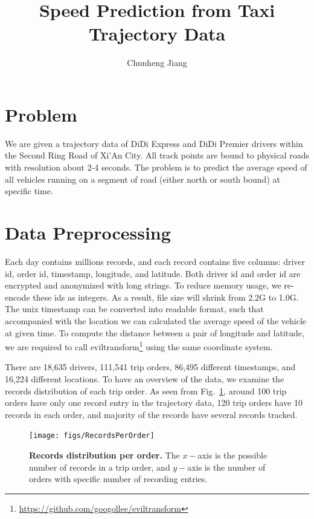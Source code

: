\documentclass[12pt]{article}
\title{Speed Prediction from Taxi Trajectory Data}
\author{Chunheng Jiang}
\numberwithin{table}{section}
\newenvironment{affiliations}{
    \setcounter{enumi}{1}
    \setlength{\parindent}{0in}
    \slshape\sloppy
    \begin{list}{\upshape$^{\arabic{enumi}}$}{
        \usecounter{enumi}
        \setlength{\leftmargin}{0in}
        \setlength{\topsep}{0in}
        \setlength{\labelsep}{0in}
        \setlength{\labelwidth}{0in}
        \setlength{\listparindent}{0in}
        \setlength{\itemsep}{0ex}
        \setlength{\parsep}{0in}
        }
    }{\end{list}\par\vspace{12pt}}
\begin{document}
\maketitle
\noindent


\section*{Problem}
We are given a trajectory data of DiDi Express and DiDi Premier drivers within the Second Ring Road of Xi'An City. 
All track points are bound to physical roads with resolution about 2-4 seconds. The problem is to predict the average speed of all vehicles running on a segment of road (either north or south bound) at specific time. 

\section*{Data Preprocessing}
Each day contains millions records, and each record contains five columns: driver id, order id, timestamp, longitude, and latitude. Both driver id and order id are encrypted and anonymized with long strings. To reduce memory usage, we re-encode these ids as integers. As a result, file size will shrink from 2.2G to 1.0G. The unix timestamp can be converted into readable format, such that accompanied with the location we can calculated the average speed of the vehicle at given time. To compute the distance between a pair of longitude and latitude, we are required to call eviltransform\footnote{\href{https://github.com/googollee/eviltransform}{https://github.com/googollee/eviltransform}} using the same coordinate system.

There are 18,635 drivers, 111,541 trip orders, 86,495 different timestamps, and 16,224 different locations. To have an overview of the data, we examine the records distribution of each trip order. As seen from Fig.~\ref{fig:recordsperorder}, around 100 trip orders have only one record entry in the trajectory data, 120 trip orders have 10 records in each order, and majority of the records have several records tracked.

\begin{figure}[!h]
\centering
\texttt{[image: figs/RecordsPerOrder]}
\caption{\textbf{Records distribution per order.} The $x-$axis is the possible number of records in a trip order, and $y-$axis is the number of orders with specific number of recording entries.} 
\label{fig:recordsperorder}
\end{figure}
\end{document}
